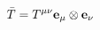\documentclass[preview]{standalone}
\begin{document}
\begin{align*}
\Bar{T} = T^{\mu\nu}\textbf{e}_{\mu}\otimes \textbf{e}_{\nu}
\end{align*}
\end{document}
